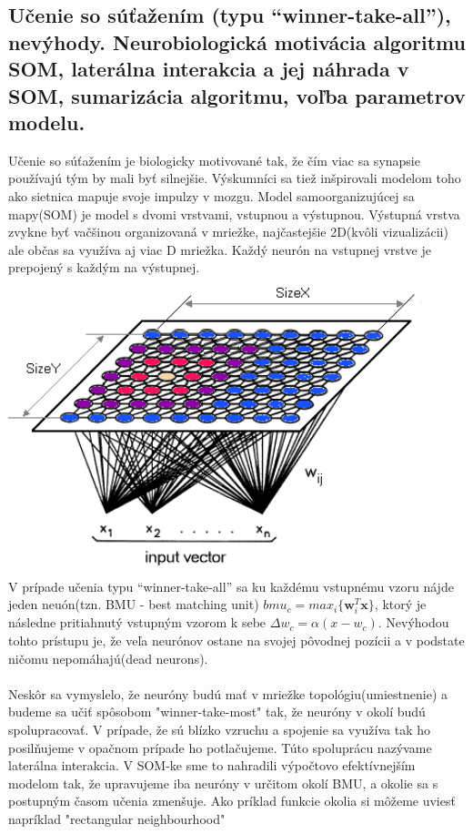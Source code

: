 \documentclass{article}
\numberwithin{equation}{section} %
\begin{document}
\subsection{Učenie so súťažením (typu “winner-take-all”), nevýhody. Neurobiologická motivácia algoritmu SOM, laterálna interakcia a jej náhrada v SOM, sumarizácia algoritmu, voľba parametrov modelu.}
Učenie so súťažením je biologicky motivované tak, že čím viac sa synapsie používajú tým by mali byť silnejšie. Výskumníci sa tiež inšpirovali modelom toho ako sietnica mapuje svoje impulzy v mozgu. Model samoorganizujúcej sa mapy(SOM) je model s dvomi vrstvami, vstupnou a výstupnou. Výstupná vrstva zvykne byť vačšinou organizovaná v mriežke, najčastejšie 2D(kvôli vizualizácii) ale občas sa využíva aj viac D mriežka. Každý neurón na vstupnej vrstve je prepojený s každým na výstupnej. \\
\includegraphics[width=12cm]{imgs/som}\\
V prípade učenia typu “winner-take-all” sa ku každému vstupnému vzoru nájde jeden neuón(tzn. BMU - best matching unit) $bmu_c = max_i\{\textbf{w}_i^T\textbf{x}\}$, ktorý je následne pritiahnutý vstupným vzorom k sebe $\Delta w_c = \alpha (x - w_c)$. Nevýhodou tohto prístupu je, že veľa neurónov ostane na svojej pôvodnej pozícii a v podstate ničomu nepomáhajú(dead neurons).\\\\
Neskôr sa vymyslelo, že neuróny budú mať v mriežke topológiu(umiestnenie) a budeme sa učiť spôsobom "winner-take-most" tak, že neuróny v okolí budú spolupracovať. V prípade, že sú blízko vzruchu a spojenie sa využíva tak ho posilňujeme v opačnom prípade ho potlačujeme. Túto spoluprácu nazývame laterálna interakcia. V SOM-ke sme to nahradili výpočtovo efektívnejším modelom tak, že upravujeme iba neuróny v určitom okolí BMU, a okolie sa s postupným časom učenia zmenšuje. Ako príklad funkcie okolia si môžeme uviesť napríklad "rectangular neighbourhood"\\
\end{document}
